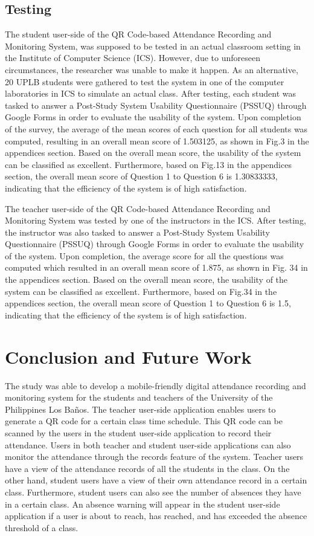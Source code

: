 \documentclass[journal]{./IEEE/IEEEtran}
\begin{document}
\subsection{Testing}
The student user-side of the QR Code-based Attendance Recording and Monitoring System, was supposed to be tested in an actual classroom setting in the Institute of Computer Science (ICS). However, due to unforeseen circumstances, the researcher was unable to make it happen. As an alternative, 20 UPLB students were gathered to test the system in one of the computer laboratories in ICS to simulate an actual class. After testing, each student was tasked to answer a Post-Study System Usability Questionnaire (PSSUQ) through Google Forms in order to evaluate the usability of the system. Upon completion of the survey, the average of the mean scores of each question for all students was computed, resulting in an overall mean score of 1.503125, as shown in Fig.3 in the appendices section. Based on the overall mean score, the usability of the system can be classified as excellent. Furthermore, based on Fig.13 in the appendices section, the overall mean score of Question 1 to Question 6 is 1.30833333, indicating that the efficiency of the system is of high satisfaction. 



The teacher user-side of the QR Code-based Attendance Recording and Monitoring System was tested by one of the instructors in the ICS. After testing, the instructor was also tasked to answer a Post-Study System Usability Questionnaire (PSSUQ) through Google Forms in order to evaluate the usability of the system. Upon completion, the average score for all the questions was computed which resulted in an overall mean score of 1.875, as shown in Fig. 34 in the appendices section. Based on the overall mean score, the usability of the system can be classified as excellent. Furthermore, based on Fig.34 in the appendices section, the overall mean score of Question 1 to Question 6 is 1.5, indicating that the efficiency of the system is of high satisfaction.



\section{Conclusion and Future Work}
The study was able to develop a mobile-friendly digital attendance recording and monitoring system for the students and teachers of the University of the Philippines Los Baños. The teacher user-side application enables users to generate a QR code for a certain class time schedule. This QR code can be scanned by the users in the student user-side application to record their attendance. Users in both teacher and student user-side applications can also monitor the attendance through the records feature of the system. Teacher users have a view of the attendance records of all the students in the class. On the other hand, student users have a view of their own attendance record in a certain class. Furthermore, student users can also see the number of absences they have in a certain class. An absence warning will appear in the student user-side application if a user is about to reach, has reached, and has exceeded the absence threshold of a class.
\end{document}
